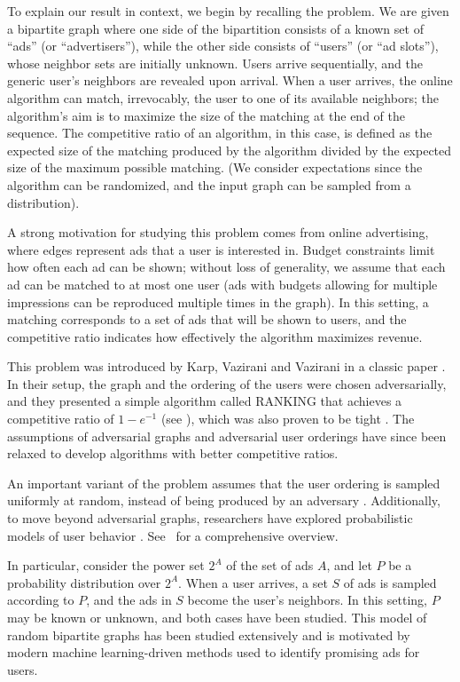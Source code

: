 \documentclass[11pt]{article}
\begin{document}
To explain our result in context, we begin by recalling the problem. We are given a bipartite graph where one side of the bipartition consists of a known set of ``ads'' (or ``advertisers''), while the other side consists of ``users'' (or ``ad slots''), whose neighbor sets are initially unknown. Users arrive sequentially, and the generic user's neighbors are revealed upon arrival. When a user arrives, the online algorithm can match, irrevocably, the user to one of its available neighbors; the algorithm's aim is to maximize the size of the matching at the end of the sequence.
The competitive ratio of an algorithm, in this case, is defined as the expected size of the matching produced by the algorithm divided by the expected size of the maximum possible matching. (We consider expectations since the algorithm can be randomized, and the input graph can be sampled from a distribution).


A strong motivation for studying this problem comes from online advertising, where edges represent ads that a user is interested in. Budget constraints limit how often each ad can be shown; without loss of generality, we assume that
each ad can be matched to at most one user (ads with budgets allowing for multiple impressions can be reproduced multiple times in the graph).
In this setting, a matching corresponds to a set of ads that will be shown to users, and the competitive ratio indicates how effectively the algorithm maximizes revenue.

This problem was introduced by Karp, Vazirani and Vazirani in a classic paper \cite{kvv90}. In their setup, the graph and the ordering of the users were chosen adversarially, and they presented a simple algorithm called RANKING that achieves a competitive ratio of \( 1 - e^{-1} \) (see \cite{kvv90,gm08}), which was also proven to be tight \cite{kvv90}. The assumptions of adversarial graphs and adversarial user orderings have since been relaxed to develop algorithms with better competitive ratios. 

An important variant of the problem assumes that the user ordering is sampled uniformly at random, instead of being produced by an adversary \cite{gm08}.
Additionally, to move beyond adversarial graphs, researchers have explored probabilistic models of user behavior \cite{msvv05}. See~\cite{mehta13} for a comprehensive overview.

\smallskip

In particular, consider the power set \( 2^{A} \) of the set of ads $A$, and let \( P \) be a probability distribution over \( 2^A \). When a user arrives, a set \( S \) of ads is sampled according to \( P \), and the ads in \( S \) become the user's neighbors. In this setting, \( P \) may be known or unknown, and both cases have been studied.  This model of random bipartite graphs has been studied extensively and is motivated by modern machine learning-driven methods used to identify promising ads for users.
\end{document}
